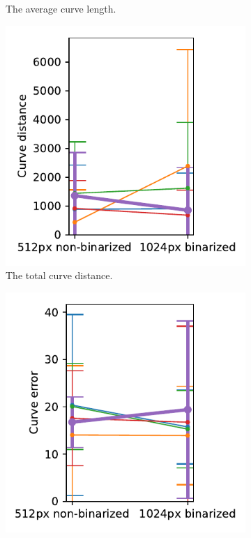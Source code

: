 \begin{figure}[h]
\begin{subfigure}{.3\textwidth}
    \caption{The average curve length.}
\end{subfigure}
    \begin{subfigure}{.3\textwidth}
    \centering
    \includegraphics[width=\textwidth]{graphics/eval/curve distance_res_binarization_tonari.pdf}
    \caption{The total curve distance.}
\end{subfigure}
    \begin{subfigure}{.3\textwidth}
    \centering
    \includegraphics[width=\textwidth]{graphics/eval/curve error_res_binarization_tonari.pdf}

\end{subfigure}
\end{figure}
